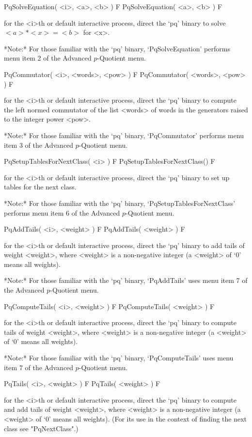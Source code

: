 \>PqSolveEquation( <i>, <a>, <b> ) F
\>PqSolveEquation( <a>, <b> ) F

for the <i>th or default interactive {\ANUPQ} process,  direct  the  `pq'
binary to solve $<a> * <x> = <b>$ for <x>.

*Note:* 
For those familiar  with  the  `pq'  binary,  `PqSolveEquation'  performs
menu item 2 of the Advanced $p$-Quotient menu.

\>PqCommutator( <i>, <words>, <pow> ) F
\>PqCommutator( <words>, <pow> ) F

for the <i>th or default interactive {\ANUPQ} process, direct  the  `pq'
binary to compute the left normed commutator of the list <words> of words
in the generators raised to the integer power <pow>.

*Note:*
For those familiar with the `pq'  binary,  `PqCommutator'  performs  menu
item 3 of the Advanced $p$-Quotient menu.

\>PqSetupTablesForNextClass( <i> ) F
\>PqSetupTablesForNextClass() F

for the <i>th or default interactive {\ANUPQ} process, direct  the  `pq'
binary to set up tables for the next class.

*Note:* 
For those familiar  with  the  `pq'  binary,  `PqSetupTablesForNextClass'
performs menu item 6 of the Advanced $p$-Quotient menu.

\>PqAddTails( <i>, <weight> ) F
\>PqAddTails( <weight> ) F

for the <i>th or default interactive {\ANUPQ} process, direct  the  `pq'
binary to add tails of weight <weight>, where <weight> is a  non-negative
integer (a <weight> of `0' means all weights).

*Note:*
For those familiar with the `pq' binary, `PqAddTails' uses menu item 7 of
the Advanced $p$-Quotient menu.

\>PqComputeTails( <i>, <weight> ) F
\>PqComputeTails( <weight> ) F

for the <i>th or default interactive {\ANUPQ} process, direct  the  `pq'
binary  to  compute  tails  of  weight  <weight>,  where  <weight>  is  a
non-negative integer (a <weight> of `0' means all weights).

*Note:*
For those familiar with the `pq' binary, `PqComputeTails' uses menu  item
7 of the Advanced $p$-Quotient menu.

\>PqTails( <i>, <weight> ) F
\>PqTails( <weight> ) F

for the <i>th or default interactive {\ANUPQ} process,  direct  the  `pq'
binary to compute and add tails of weight <weight>, where <weight>  is  a
non-negative integer (a <weight> of `0' means all weights). (For its  use
in the context of finding the next class see "PqNextClass".)

